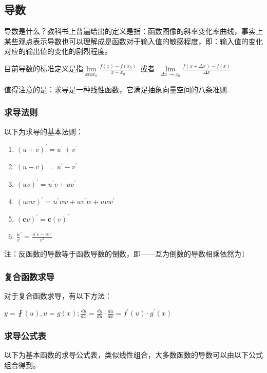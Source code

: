 \documentclass[UTF8]{ctexbook}
\newcommand{\limNormal}[1]{$\lim\limits_{#1}$}
\newcommand{\derivative}{^\prime}
\begin{document}
{{{  \subsection{导数}{
    导数是什么？教科书上普遍给出的定义是指：函数图像的斜率变化率曲线，事实上某些观点表示导数也可以理解成是函数对于输入值的敏感程度，即：输入值的变化对应的输出值的变化的剧烈程度。

    目前导数的标准定义是指\limNormal{x to x_0}$\frac{f(x) - f(x_0)}{x - x_0}$\ 或者\ \limNormal{\Delta x \to x_0}$\frac{f(x + \Delta x) - f(x)}{\Delta x}$

    值得注意的是：求导是一种线性函数，它满足抽象向量空间的八条准则.

    \subsubsection{求导法则}{
      以下为求导的基本法则：
      \begin{enumerate}
        \item $(u + v)\derivative = u\derivative + v\derivative$
        \item $(u - v)\derivative = u\derivative - v\derivative$
        \item $(uv)\derivative = u\derivative v + uv\derivative$
        \item $(uvw)\derivative = u\derivative vw + uv\derivative w + uvw\derivative$
        \item $(\mathbf{c}v)\derivative = \mathbf{c}(v)\derivative$
        \item $\frac{u}{v}\derivative = \frac{u\derivative v - uv\derivative}{v^2}$
      \end{enumerate}
      注：反函数的导数等于函数导数的倒数，即——互为倒数的导数相乘依然为1
    }

    \subsubsection{复合函数求导}{
      对于复合函数求导，有以下方法：

      $y = \fint(u), u = g(x); \frac{dy}{dx} = \frac{dy}{du} \cdot \frac{du}{dx} = f\derivative(u) \cdot g\derivative(x)$
    }

    \subsubsection{求导公式表}{
      以下为基本函数的求导公式表，类似线性组合，大多数函数的导数可以由以下公式组合得到。

}}}}}
\end{document}
